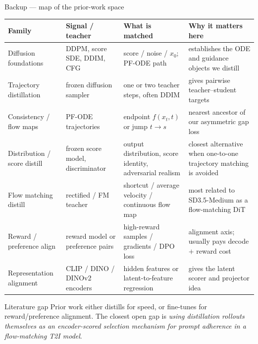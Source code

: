\documentclass[aspectratio=169,10pt]{beamer}
\begin{document}
\begin{frame}{Backup --- map of the prior-work space}
  \scriptsize
  \begin{center}
  \begin{adjustbox}{max width=\textwidth}
  \begin{tabular}{@{}L{0.18\textwidth}L{0.23\textwidth}L{0.25\textwidth}L{0.24\textwidth}@{}}
    \toprule
    \textbf{Family} & \textbf{Signal / teacher} & \textbf{What is matched} & \textbf{Why it matters here} \\
    \midrule
    Diffusion foundations & DDPM, score SDE, DDIM, CFG & score / noise / \(x_0\); PF-ODE path & establishes the ODE and guidance objects we distill \\
    Trajectory distillation & frozen diffusion sampler & one or two teacher steps, often DDIM & gives pairwise teacher--student targets \\
    Consistency / flow maps & PF-ODE trajectories & endpoint \(f(x_t,t)\) or jump \(t \to s\) & nearest ancestor of our asymmetric gap loss \\
    Distribution / score distill & frozen score model, discriminator & output distribution, score identity, adversarial realism & closest alternative when one-to-one trajectory matching is avoided \\
    Flow matching distill & rectified / FM teacher & shortcut / average velocity / continuous flow map & most related to SD3.5-Medium as a flow-matching DiT \\
    Reward / preference align & reward model or preference pairs & high-reward samples / gradients / DPO loss & alignment axis; usually pays decode $+$ reward cost \\
    Representation alignment & CLIP / DINO / DINOv2 encoders & hidden features or latent-to-feature regression & gives the latent scorer and projector idea \\
    \bottomrule
  \end{tabular}
  \end{adjustbox}
  \end{center}
  \vspace{0.3em}
  \begin{alertblock}{Literature gap}
    Prior work either distills for speed, or fine-tunes for reward/preference
    alignment. The closest open gap is \emph{using distillation rollouts
    themselves as an encoder-scored selection mechanism for prompt adherence
    in a flow-matching T2I model}.
  \end{alertblock}
\end{frame}
\end{document}
